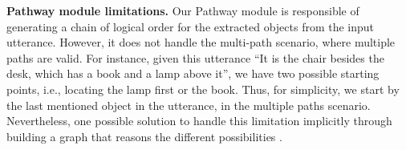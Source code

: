 \noindent \textbf{Pathway module limitations.}
Our Pathway module is responsible of generating a chain of logical order for the extracted objects from the input utterance.
However, it does not handle the multi-path scenario, where multiple paths are valid.
For instance, given this utterance ``It is the chair besides the desk, which has a book and a lamp above it'', we have two possible starting points, i.e., locating the lamp first or the book. 
Thus, for simplicity, we start by the last mentioned object in the utterance, in the multiple paths scenario.
Nevertheless, one possible solution to handle this limitation implicitly through building a graph that reasons the different possibilities \citep{salzmann2020trajectron++}. 
